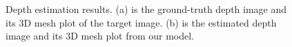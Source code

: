 


\begin{figure}[!t]
	\centering
	\vspace{-0.1in}
	\caption{Depth estimation results. (a) is the ground-truth depth image and its 3D mesh plot of the target image. (b) is the estimated depth image and its 3D mesh plot from our model.}
	\label{estimation_result}
\vspace{-0.15in}
\end{figure}

